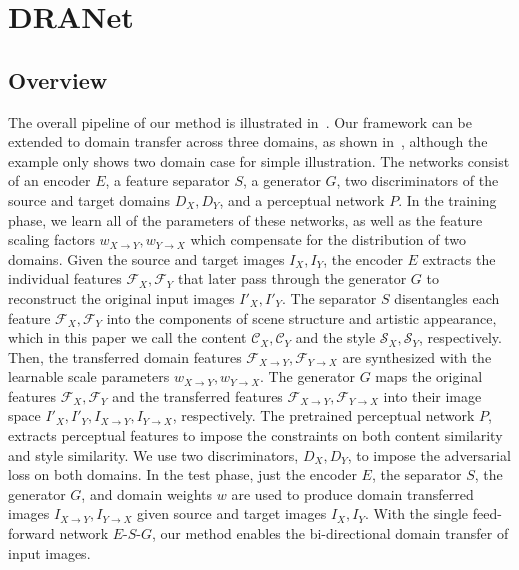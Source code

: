 \documentclass[final]{cvpr}
\begin{document}
\section{DRANet}
\label{sec:method}

\subsection{Overview}
\label{sec:overview}
The overall pipeline of our method is illustrated in~.
Our framework can be extended to domain transfer across three domains, as shown in~, although the example only shows two domain case for simple illustration. 
The networks consist of an encoder $E$, a feature separator $S$, a generator $G$, two discriminators of the source and target domains $D_X, D_Y$, and a perceptual network $P$.
In the training phase, we learn all of the parameters of these networks, as well as the feature scaling factors $w_{X \to Y}, w_{Y \to X}$ which compensate for the distribution of two domains.
Given the source and target images $I_X, I_Y$, the encoder $E$ extracts the individual features $\mathcal{F}_X, \mathcal{F}_Y$ that later pass through the generator $G$ to reconstruct the original input images $I'_X, I'_Y$.
The separator $S$ disentangles each feature $\mathcal{F}_X, \mathcal{F}_Y$ into the components of scene structure and artistic appearance, which in this paper we call the content $\mathcal{C}_X, \mathcal{C}_Y$ and the style $\mathcal{S}_X, \mathcal{S}_Y$, respectively.
Then, the transferred domain features $\mathcal{F}_{X \to Y}, \mathcal{F}_{Y \to X}$ are synthesized with the learnable scale parameters $w_{X \to Y}, w_{Y \to X}$.
The generator $G$ maps the original features $\mathcal{F}_X, \mathcal{F}_Y$ and the transferred features $\mathcal{F}_{X \to Y}, \mathcal{F}_{Y \to X}$ into their image space $I'_X, I'_Y, I_{X \to Y}, I_{Y \to X}$, respectively.
The pretrained perceptual network $P$, extracts perceptual features to impose the constraints on both content similarity and style similarity.
We use two discriminators, $D_X, D_Y$, to impose the adversarial loss on both domains.
In the test phase, just the encoder $E$, the separator $S$, the generator $G$, and domain weights $w$ are used to produce domain transferred images $I_{X\to Y}, I_{Y\to X}$ given source and target images $I_X, I_Y$.
With the single feed-forward network $E$-$S$-$G$, our method enables the bi-directional domain transfer of input images. 
\end{document}
